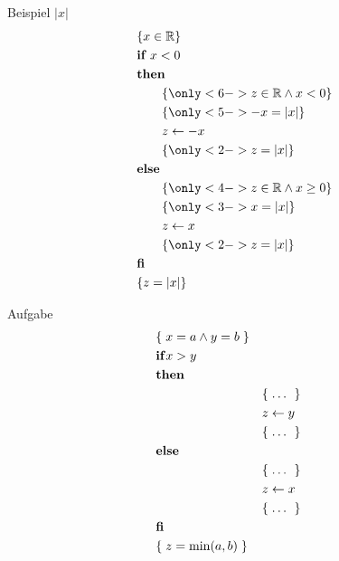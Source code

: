 \begin{frame}{Beispiel $\vert x \vert$}
	\vspace{-10mm}
	\begin{align*}
		&\{ x \in\nR \} \\
		&\textbf{if } x < 0 \\
		&\textbf{then } \\
		&\hspace{2em} \{ \only<6->{ z\in\nR \wedge x < 0 } \} \\
		&\hspace{2em} \{ \only<5->{ -x = \vert x \vert } \} \\
		&\hspace{2em}  z \leftarrow -x   \\
		&\hspace{2em} \{ \only<2->{ z = \vert x \vert } \} \\
		&\textbf{else} \\
		&\hspace{2em} \{ \only<4->{ z\in\nR \wedge x\geq 0 } \} \\
		&\hspace{2em} \{ \only<3->{ x = \vert x \vert } \} \\
		&\hspace{2em} z \leftarrow x \\
		&\hspace{2em} \{ \only<2->{ z = \vert x \vert } \} \\
		&\textbf{fi} \\
		&\{ z = \vert x \vert \} 
	\end{align*}
\end{frame}

\begin{frame}{Aufgabe}
	\vspace{-10mm}
	  \begin{alignat*}{2}
	&\{\;x=a \land y=b\;\}  \\
	&\mathbf{if } x>y  \\
	&\mathbf{then } \\
	&&&\{\; \dots\ \;\} \\
	&&& z \gets y  \\
	&&&\{\; \dots\ \;\} \\
	&\mathbf{else } \\
	&&&\{\; \dots\ \;\} \\
	&&& z \gets x  \\
	&&&\{\; \dots\ \;\} \\
	&\mathbf{fi } \\
	&\{\;z=\min(a,b)\;\}
	\end{alignat*}
\end{frame}


